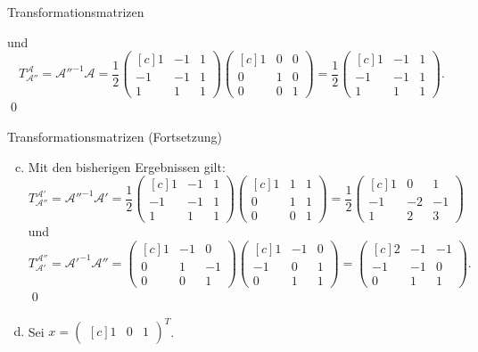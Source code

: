 \documentclass[german]{../spicker}
\newcommand{\vektor}[1]{\begin{pmatrix*}[c] #1 \end{pmatrix*}}
\begin{document}
\begin{example}{Transformationsmatrizen}
\begin{enumerate}[a)]
$$              $$
              und
              $$
                  T^{\mathcal{A}}_{\mathcal{A}''} = \mathcal{A}''^{-1}\mathcal{A} = \frac{1}{2}\vektor{1 & -1 & 1 \\ -1 & -1 & 1 \\ 1 & 1 & 1} \vektor{1 & 0 & 0 \\ 0 & 1 & 0 \\ 0 & 0 & 1} = \frac{1}{2}\vektor{1 & -1 & 1 \\ -1 & -1 & 1 \\ 1 & 1 & 1}.
              $$\qed
    \end{enumerate}

\end{example}

\begin{example}{Transformationsmatrizen (Fortsetzung)}
    \begin{enumerate}[a)]
        \setcounter{enumi}{2}
        \item Mit den bisherigen Ergebnissen gilt:
              $$
                  T^{\mathcal{A}'}_{\mathcal{A}''} = \mathcal{A}''^{-1}\mathcal{A}' = \frac{1}{2}\vektor{1 & -1 & 1 \\ -1 & -1 & 1 \\ 1 & 1 & 1} \vektor{1 & 1 & 1 \\ 0 & 1 & 1 \\ 0 & 0 & 1} = \frac{1}{2}\vektor{1 & 0 & 1 \\ -1 & -2 & -1 \\ 1 & 2 & 3}
              $$
              und
              $$
                  T^{\mathcal{A}''}_{\mathcal{A}'} = \mathcal{A}'^{-1}\mathcal{A}'' = \vektor{1 & -1 & 0 \\ 0 & 1 & -1 \\ 0 & 0 & 1} \vektor{1 & -1 & 0 \\ -1 & 0 & 1 \\ 0 & 1 & 1} = \vektor{2 & -1 & -1 \\ -1 & -1 & 0 \\ 0 & 1 & 1}.
              $$\qed
        \item Sei $x = \vektor{1 & 0 & 1}^T$.


\end{enumerate}
\end{example}
\end{document}
